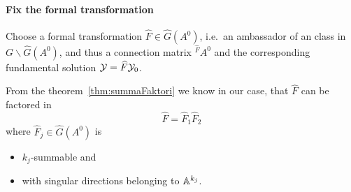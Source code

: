 \paragraph{Fix the formal transformation}
Choose a formal transformation $\hat F\in\hat G(A^0)$, i.e.\ an ambassador of
an class in $G\backslash\hat G(A^0)$, and thus a connection matrix
${}^{\hat F}\!A^0$ and the corresponding fundamental solution
$\mathcal{Y}=\widehat F\mathcal{Y}_0$.

From the theorem~\ref{thm:summaFaktori} we know in our case, that $\hat F$ can
be factored in
\[
  \hat F=\hat F_1 \hat F_2
\]
where $\hat F_j\in\hat G(A^0)$ is
\begin{itemize}
  \item $k_j$-summable and
  \item with singular directions belonging to $\mathbb{A}^{k_j}$.
\end{itemize}

